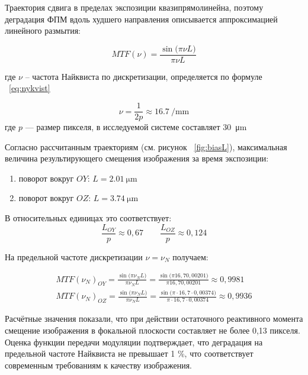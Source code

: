 Траектория сдвига в пределах экспозиции квазипрямолинейна, поэтому деградация ФПМ вдоль худшего направления описывается аппроксимацией линейного размытия:

\begin{equation}
	\label{eq:MTF_aprox}
  MTF(\nu) = \frac{\sin\!\bigl(\pi \nu L\bigr)}{\pi \nu L}
	\end{equation}

где \(\nu\) -- частота Найквиста по дискретизации, определяется по формуле ~\eqref{eq:nykvist}

\begin{equation}
	\label{eq:nykvist}
	\nu = \frac{1}{2p} \approx \SI{16.7}{\per\milli\meter}
\end{equation}
где \(p\) --- размер пикселя, в исследуемой системе составляет \SI{30}{\micro\meter}

Согласно рассчитанным траекториям (см. рисунок ~\ref{fig:biasL}), максимальная величина результирующего смещения изображения за время экспозиции:
\begin{enumerate}
	\item поворот вокруг $OY$: $L= \SI{2,01}{\micro\meter}$
	\item поворот вокруг $OZ$: $L= \SI{3,74}{\micro\meter}$
	\end{enumerate}
	
В относительных единицах это соответствует:
\begin{equation}
	\frac{L_{OY}}{p} \approx 0,67 \quad \quad \frac{L_{OZ}}{p} \approx 0,124
\end{equation}

На предельной частоте дискретизации $\nu = \nu_N$ получаем:

\begin{equation}
	\begin{split}
	\label{eq:MTF_result}
	MTF(\nu_N)_{OY}=\frac{\sin\!\bigl(\pi \nu_N L\bigr)}{\pi \nu_N L} =  \frac{\sin\!\bigl(\pi 16,7 0,00201 \bigr)}{\pi 16,7 0,00201} \approx  0,9981\\
	MTF(\nu_N)_{OZ}=\frac{\sin\!\bigl(\pi \nu_N L\bigr)}{\pi \nu_N L} =  \frac{\sin\!\bigl(\pi \cdot 16,7 \cdot 0,00374 \bigr)}{\pi \cdot 16,7 \cdot 0,00374} \approx 0,9936
	\end{split}
	\end{equation}

Расчётные значения показали, что при действии остаточного реактивного момента смещение изображения в фокальной плоскости составляет не более 0,13 пикселя. Оценка функции передачи модуляции подтверждает, что деградация на предельной частоте Найквиста не превышает 1 \%, что соответствует современным требованиям к качеству изображения.

